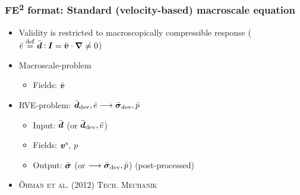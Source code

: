 \documentclass[11pt]{beamer} %
\newcommand{\roughcite}[1]{\textsc{#1}}
\begin{document}
\begin{frame}
 \frametitle{FE\textsuperscript{2} format: Standard (velocity-based) macroscale equation}
 \begin{itemize}
  \item Validity is restricted to macroscopically compressible response ($\bar{e} \overset{\mathrm{def}}{=} \bar{\boldsymbol{d}} \mathbin{\vcentcolon} \boldsymbol{I} = \bar{\boldsymbol{v}}\cdot \boldsymbol{\nabla}\neq 0$)
 \end{itemize}
 \begin{itemize}
  \item Macroscale-problem
  \begin{itemize}
   \item Fields: $\bar{\boldsymbol{v}}$%
  \end{itemize}
  \item RVE-problem: $\bar{\boldsymbol{d}}_{\mathrm{dev}}, \bar{e} \longrightarrow \bar{\boldsymbol{\sigma}}_{\mathrm{dev}}, \bar{p}$
  \begin{itemize}
   \item Input: $\bar{\boldsymbol{d}}$ (or $\bar{\boldsymbol{d}}_{\mathrm{dev}}, \bar{e}$)
   \item Fields: $\boldsymbol{v}^{\mathrm{s}}$, $p$%
   \item Output: $\bar{\boldsymbol{\sigma}}$ (or $\longrightarrow \bar{\boldsymbol{\sigma}}_{\mathrm{dev}}, \bar{p}$) (post-processed)
  \end{itemize}
 \end{itemize}

 \begin{itemize}
   \item \roughcite{\"Ohman et al. (2012) Tech. Mechanik}
 \end{itemize}


\end{frame}
\end{document}
